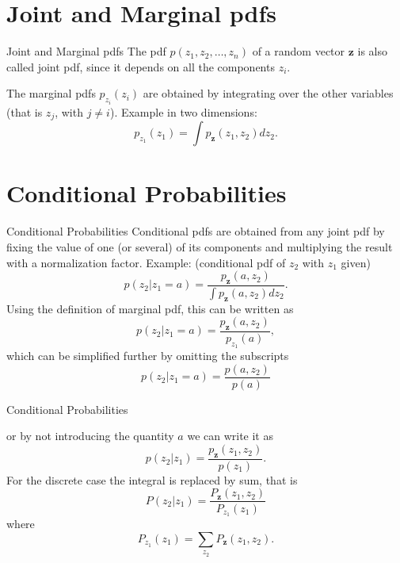 \documentclass{beamer}
\begin{document}
\section{Joint and Marginal pdfs}

\begin{frame}{Joint and Marginal pdfs}
  The pdf $p(z_1, z_2, \ldots, z_n)$ of a random vector $\mathbf{z}$ is also
  called joint pdf, since it depends on all the components $z_i$.

  The marginal pdfs $p_{z_i}(z_i)$ are obtained by integrating over the other
  variables (that is $z_j$, with $j \ne i$). Example in two dimensions:
  \[ p_{z_1}(z_1) = \int p_{\mathbf{z}}(z_1, z_2)dz_2.\]

\end{frame}

\section{Conditional Probabilities}

\begin{frame}{Conditional Probabilities}
  Conditional pdfs are obtained from any joint pdf by fixing the value of one (or
  several) of its components and multiplying the result with a normalization
  factor. Example: (conditional pdf of $z_2$ with $z_1$ given)
  \[
  p(z_2|z_1 = a) =
  \frac{ p_{\mathbf{z}}(a, z_2)}{\int p_{\mathbf{z}}(a, z_2)dz_2}.
  \]
  Using the definition of marginal pdf, this can be written as
  \[
  p(z_2|z_1 = a) =
  \frac{ p_{\mathbf{z}}(a, z_2)}{p_{z_1}(a)},
  \]
  which can be simplified further by omitting the subscripts
  \[
  p(z_2|z_1 = a) =
  \frac{ p(a, z_2)}{p(a)}
  \]
\end{frame}

\begin{frame}{Conditional Probabilities}

  or by not introducing the quantity $a$ we can write it as
  \[
  p(z_2|z_1) =
  \frac{ p_{\mathbf{z}}(z_1, z_2)}{p(z_1)}.
  \]
  For the discrete case the integral is replaced by sum, that is
  \[
  P(z_2|z_1) = \frac{P_{\mathbf{z}}(z_1, z_2)}{P_{z_1}(z_1)}
  \]
  where
  \[
  P_{z_1}(z_1) = \sum_{z_2}P_{\mathbf{z}}(z_1, z_2).
  \]
\end{frame}
\end{document}

